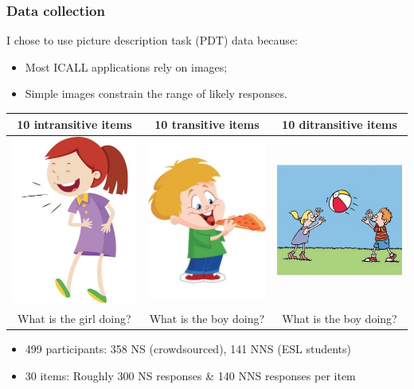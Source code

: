 \documentclass[handout,xcolor={dvipsnames}]{beamer}
\begin{document}
\begin{frame}
\frametitle{Data collection}
\pause
I chose to use picture description task (PDT) data because:
\begin{itemize}
\pause
\item Most ICALL applications rely on images;
\pause
\item Simple images constrain the range of likely responses.
\end{itemize}
\pause
\begin{table}[width=.8\columnwidth]\small
\begin{center}
\begin{tabular}{|c|c|c|}
\hline
10 intransitive items & 10 transitive items & 10 ditransitive items \\
\hline
{\includegraphics[width=0.2\columnwidth]{figures/I20.jpg}} & {\includegraphics[width=0.2\columnwidth]{figures/I02.jpg}} & {\includegraphics[width=0.25\columnwidth]{figures/I21.jpg}} \\
\hline
What is the girl doing? & What is the boy doing? & What is the boy doing? \\
\hline
\end{tabular}
\end{center}
\end{table}
\smallskip
\begin{itemize}
\pause
\item 499 participants: 358 NS (crowdsourced), 141 NNS (ESL students)
\pause
\item 30 items: Roughly 300 NS responses \& 140 NNS responses per item
\end{itemize}
\end{frame}
\end{document}
